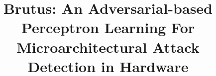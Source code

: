 \documentclass{sig-alternate}
\title{Brutus: An Adversarial-based Perceptron Learning For Microarchitectural Attack Detection in Hardware}
\author{}
\begin{document}
\maketitle

\thispagestyle{firstpage}
\pagestyle{plain}

\begin{spacing}{1}












\end{spacing}









\end{document}
